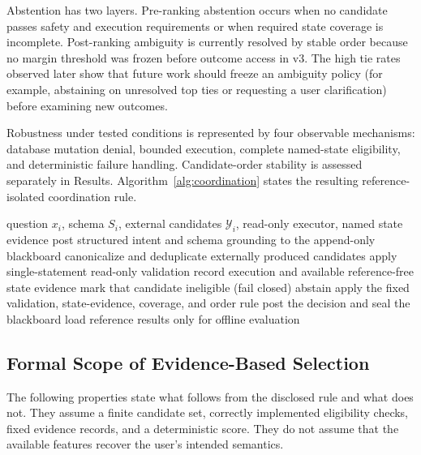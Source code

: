\documentclass[information,article,submit,moreauthors]{Definitions/mdpi}
\begin{document}
Abstention has two layers. Pre-ranking abstention occurs when no candidate passes safety and execution requirements or when required state coverage is incomplete. Post-ranking ambiguity is currently resolved by stable order because no margin threshold was frozen before outcome access in v3. The high tie rates observed later show that future work should freeze an ambiguity policy (for example, abstaining on unresolved top ties or requesting a user clarification) before examining new outcomes.

Robustness under tested conditions is represented by four observable mechanisms: database mutation denial, bounded execution, complete named-state eligibility, and deterministic failure handling. Candidate-order stability is assessed separately in Results. Algorithm~\ref{alg:coordination} states the resulting reference-isolated coordination rule.

\begin{algorithm}[htbp]
\caption{Reference-isolated deterministic coordination}
\label{alg:coordination}
\begin{algorithmic}[1]
\REQUIRE question $x_i$, schema $S_i$, external candidates $\mathcal{Y}_i$, read-only executor, named state evidence
\STATE post structured intent and schema grounding to the append-only blackboard
\STATE canonicalize and deduplicate externally produced candidates
  \STATE apply single-statement read-only validation
  \STATE record execution and available reference-free state evidence
\ENDFOR
{}
  \STATE mark that candidate ineligible (fail closed)
\ENDIF
{}
  \STATE abstain
\ELSE
  \STATE apply the fixed validation, state-evidence, coverage, and order rule
\ENDIF
\STATE post the decision and seal the blackboard
\STATE load reference results only for offline evaluation
\end{algorithmic}
\end{algorithm}

\subsection{Formal Scope of Evidence-Based Selection}
\label{sec:formal-scope}

The following properties state what follows from the disclosed rule and what does not. They assume a finite candidate set, correctly implemented eligibility checks, fixed evidence records, and a deterministic score. They do not assume that the available features recover the user's intended semantics.
\end{document}
